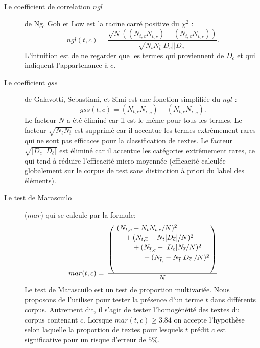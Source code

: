 \begin{description}
	\item[Le coefficient de correlation $ngl$] de Ng, Goh et Low \citep{ng1997ngl} est la racine carré positive du $\chi^2$ \citep{schutze1995chi2}:
	\[ngl(t,c) = \frac{\sqrt{N} ((N_{t,c} N_{\overline{t},\overline{c}}) - (N_{t,\overline{c}} N_{\overline{t},c}))}{\sqrt{N_t N_{\overline{t}} \vert D_c \vert  \vert D_{\overline{c}} \vert }}.\]
	L'intuition est de ne regarder que les termes qui proviennent de $D_c$ et qui indiquent l'appartenance à $c$.
	\item[Le coefficient $gss$] de Galavotti, Sebastiani, et Simi
	 \citep{galavotti2000gss} est une fonction simplifiée du $ngl$ \citep{ng1997ngl} :
	\[gss(t,c) = (N_{t,c} N_{\overline{t},\overline{c}}) -  (N_{t,\overline{c}} N_{\overline{t},c}).\]
   Le facteur $N$ a été éliminé car il est le même pour tous les termes. Le facteur $\sqrt{N_tN_{\overline{t}}}$ est supprimé car il accentue les termes extrêmement rares qui ne sont pas efficaces pour la classification de textes. Le facteur  $\sqrt{\vert D_c \vert \vert D_{\overline{c}} \vert}$ est éliminé car il accentue les catégories extrêmement rares, ce qui tend à réduire l'efficacité micro-moyennée (efficacité calculée globalement sur le corpus de test sans distinction à priori du label des éléments).
   \item[Le test de Marascuilo] ($mar$) qui se calcule par la formule:
    \begin{equation*} mar(t, c) =  
    \,
    \dfrac{\left(
    	\splitdfrac{\splitdfrac{\splitdfrac{(N_{t,c} - N_{t}N_{t,c}/N)^2}{+ (N_{t,\overline{c}} - N_{t} \vert D_{\overline{c}} \vert /N)^2}}{+ (N_{\overline{t},c} - \vert D_c \vert N_{\overline{t}}/N)^2}}{+ (N_{\overline{t},\overline{}} - N_{\overline{t}} \vert D_{\overline{c}} \vert /N)^2}\right)}{N}
    \end{equation*}
    Le test de Marascuilo est un test de proportion multivariée. Nous proposons de l'utiliser pour tester la présence d'un terme $t$ dans différents corpus. Autrement dit, il s'agit de tester l'homogénéité des textes du corpus contenant $c$. Lorsque $ mar(t, c) \geq 3.84$ on accepte l'hypothèse selon laquelle la proportion de textes pour lesquels $t$ prédit $c$ est significative pour un risque d'erreur de $5\%$.

\end{description}
